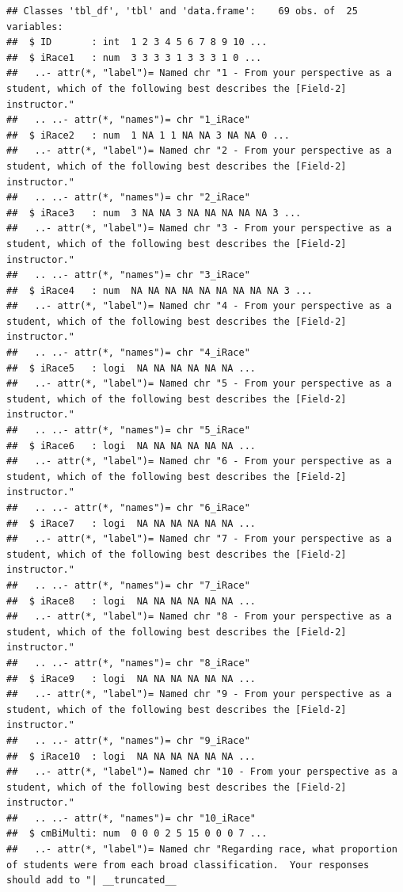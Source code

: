 \documentclass[
  11pt,
]{book}
\begin{document}
\begin{verbatim}
## Classes 'tbl_df', 'tbl' and 'data.frame':    69 obs. of  25 variables:
##  $ ID       : int  1 2 3 4 5 6 7 8 9 10 ...
##  $ iRace1   : num  3 3 3 3 1 3 3 3 1 0 ...
##   ..- attr(*, "label")= Named chr "1 - From your perspective as a student, which of the following best describes the [Field-2] instructor."
##   .. ..- attr(*, "names")= chr "1_iRace"
##  $ iRace2   : num  1 NA 1 1 NA NA 3 NA NA 0 ...
##   ..- attr(*, "label")= Named chr "2 - From your perspective as a student, which of the following best describes the [Field-2] instructor."
##   .. ..- attr(*, "names")= chr "2_iRace"
##  $ iRace3   : num  3 NA NA 3 NA NA NA NA NA 3 ...
##   ..- attr(*, "label")= Named chr "3 - From your perspective as a student, which of the following best describes the [Field-2] instructor."
##   .. ..- attr(*, "names")= chr "3_iRace"
##  $ iRace4   : num  NA NA NA NA NA NA NA NA NA 3 ...
##   ..- attr(*, "label")= Named chr "4 - From your perspective as a student, which of the following best describes the [Field-2] instructor."
##   .. ..- attr(*, "names")= chr "4_iRace"
##  $ iRace5   : logi  NA NA NA NA NA NA ...
##   ..- attr(*, "label")= Named chr "5 - From your perspective as a student, which of the following best describes the [Field-2] instructor."
##   .. ..- attr(*, "names")= chr "5_iRace"
##  $ iRace6   : logi  NA NA NA NA NA NA ...
##   ..- attr(*, "label")= Named chr "6 - From your perspective as a student, which of the following best describes the [Field-2] instructor."
##   .. ..- attr(*, "names")= chr "6_iRace"
##  $ iRace7   : logi  NA NA NA NA NA NA ...
##   ..- attr(*, "label")= Named chr "7 - From your perspective as a student, which of the following best describes the [Field-2] instructor."
##   .. ..- attr(*, "names")= chr "7_iRace"
##  $ iRace8   : logi  NA NA NA NA NA NA ...
##   ..- attr(*, "label")= Named chr "8 - From your perspective as a student, which of the following best describes the [Field-2] instructor."
##   .. ..- attr(*, "names")= chr "8_iRace"
##  $ iRace9   : logi  NA NA NA NA NA NA ...
##   ..- attr(*, "label")= Named chr "9 - From your perspective as a student, which of the following best describes the [Field-2] instructor."
##   .. ..- attr(*, "names")= chr "9_iRace"
##  $ iRace10  : logi  NA NA NA NA NA NA ...
##   ..- attr(*, "label")= Named chr "10 - From your perspective as a student, which of the following best describes the [Field-2] instructor."
##   .. ..- attr(*, "names")= chr "10_iRace"
##  $ cmBiMulti: num  0 0 0 2 5 15 0 0 0 7 ...
##   ..- attr(*, "label")= Named chr "Regarding race, what proportion of students were from each broad classification.  Your responses should add to "| __truncated__

\end{verbatim}
\end{document}
